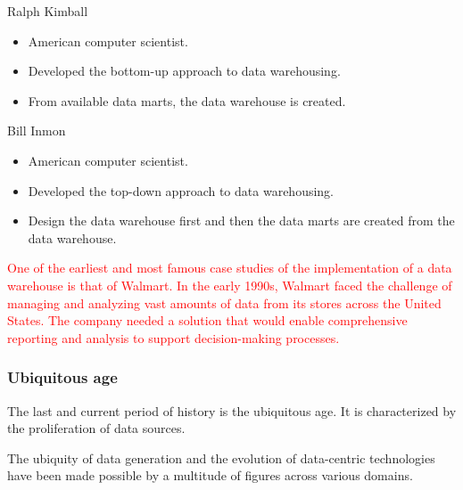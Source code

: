 \begin{slidebox}{Ralph Kimball}{}
  \begin{itemize}
    \item American computer scientist.
    \item Developed the bottom-up approach to data warehousing.
    \item From available data marts, the data warehouse is created.
  \end{itemize}
\end{slidebox}

\begin{slidebox}{Bill Inmon}{}
  \begin{itemize}
    \item American computer scientist.
    \item Developed the top-down approach to data warehousing.
    \item Design the data warehouse first and then the data marts are created from the data warehouse.
  \end{itemize}
\end{slidebox}

\textcolor{red}{
One of the earliest and most famous case studies of the implementation of a data warehouse
is that of Walmart. In the early 1990s, Walmart faced the challenge of managing and
analyzing vast amounts of data from its stores across the United States. The company
needed a solution that would enable comprehensive reporting and analysis to support
decision-making processes.
}

\subsubsection{Ubiquitous age}

The last and current period of history is the ubiquitous age.  It is characterized by the
proliferation of data sources.

The ubiquity of data generation and the evolution of data-centric technologies have been
made possible by a multitude of figures across various domains.

